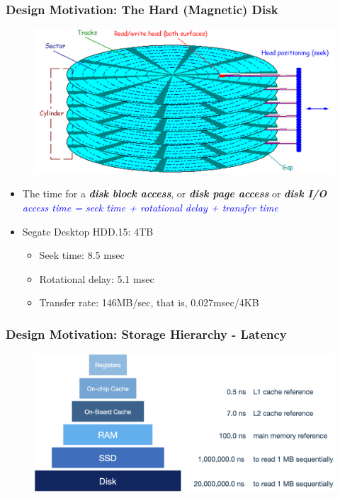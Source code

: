 \begin{frame}[fragile]
	\frametitle{Design Motivation: The Hard (Magnetic) Disk}
	\begin{figure}
		\includegraphics[width=0.5\linewidth]{figs/dbfile-harddisk.png}
	\end{figure}
	\begin{itemize}
		\pause
		\item The time for a \textbf{\emph{disk block access}}, or \textbf{\emph{disk page access}} or 
		\textbf{\emph{disk I/O}}
\\
		\emph{\textcolor{blue}{access time {\rm =} seek time {\rm +} rotational delay {\rm +} transfer time}}
		\pause
		\item Segate Desktop HDD.15: 4TB
		\begin{itemize}
			\item Seek time: 8.5 msec
			\item Rotational delay: 5.1 msec
			\item Transfer rate: 146MB/sec, that is, 0.027msec/4KB
		\end{itemize}
	\end{itemize}
\end{frame}

\begin{frame}[fragile]
	\frametitle{Design Motivation: Storage Hierarchy - Latency}
	\begin{figure}
		\includegraphics[width=0.85\linewidth]{figs/dbfile-latency1.png}
	\end{figure}
\end{frame}

